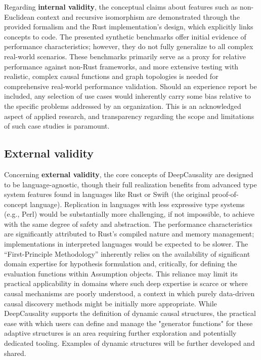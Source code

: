 Regarding \textbf{internal validity}, the conceptual claims about features such as non-Euclidean context and recursive isomorphism are demonstrated through the provided formalism and the Rust implementation's design, which explicitly links concepts to code. The presented synthetic benchmarks offer initial evidence of performance characteristics; however, they do not fully generalize to all complex real-world scenarios. These benchmarks primarily serve as a proxy for relative performance against non-Rust frameworks, and more extensive testing with realistic, complex causal functions and graph topologies is needed for comprehensive real-world performance validation. Should an experience report be included, any selection of use cases would inherently carry some bias relative to the specific problems addressed by an organization. This is an acknowledged aspect of applied research, and transparency regarding the scope and limitations of such case studies is paramount.

\subsection{External validity}

Concerning \textbf{external validity}, the core concepts of DeepCausality are designed to be language-agnostic, though their full realization benefits from advanced type system features found in languages like Rust or Swift (the original proof-of-concept language). Replication in languages with less expressive type systems (e.g., Perl) would be substantially more challenging, if not impossible, to achieve with the same degree of safety and abstraction. The performance characteristics are significantly attributed to Rust's compiled nature and memory management; implementations in interpreted languages would be expected to be slower. The ``First-Principle Methodology'' inherently relies on the availability of significant domain expertise for hypothesis formulation and, critically, for defining the evaluation functions within Assumption objects. This reliance may limit its practical applicability in domains where such deep expertise is scarce or where causal mechanisms are poorly understood, a context in which purely data-driven causal discovery methods might be initially more appropriate. While DeepCausality supports the definition of dynamic causal structures, the practical ease with which users can define and manage the "generator functions" for these adaptive structures is an area requiring further exploration and potentially dedicated tooling. Examples of dynamic structures will be further developed and shared.


